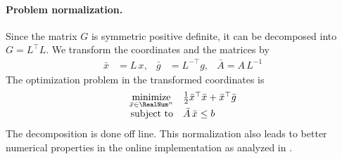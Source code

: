 \paragraph*{Problem normalization.}
Since the matrix $G$ is symmetric positive definite, it can be decomposed into $G = L^\top L$.
We transform the coordinates and the matrices by
\begin{align}
 \bar{x} &= L\,x,&
 \bar{g} &= L^{-\top} g,&
 \bar{A} = A\,L^{-1} 
\end{align}
The optimization problem in the transformed coordinates is
\begin{align}
 \begin{array}{rl}
  \underset{\bar{x} \in \RealNum^{n}}{\text{minimize}} & \tfrac{1}{2} \bar{x}^\top \bar{x} + \bar{x}^\top \bar{g}
  \\[1ex]
  \text{subject to} & \bar{A}\,\bar{x} \leq b
 \end{array}
\end{align}
The decomposition is done off line.
This normalization also leads to better numerical properties in the online implementation as analyzed in \cite{Gould:EqualityConstrainedQuadraticProgramming}.

